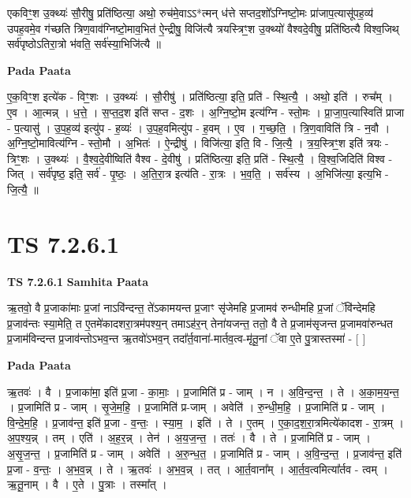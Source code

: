 \documentclass[17pt]{extarticle}
\begin{document}
एकविꣳ॒॒श उ॒क्थ्यः॑ सौ॒रीषु॒ प्रति॑ष्ठित्या॒ अथो॒ रुच॑मे॒वाऽऽ*त्मन् ध॑त्ते सप्तद॒शो᳚ऽग्निष्टो॒मः प्रा॑जाप॒त्यासू॑पह॒व्य॑ उपह॒वमे॒व ग॑च्छति त्रिण॒वाव॑ग्निष्टो॒माव॒भित॑ ऐ॒न्द्रीषु॒ विजि॑त्यै त्रयस्त्रिꣳ॒॒श उ॒क्थ्यो॑ वैश्वदे॒वीषु॒ प्रति॑ष्ठित्यै विश्व॒जिथ् सर्व॑पृष्ठोऽतिरा॒त्रो भ॑वति॒ सर्व॑स्या॒भिजि॑त्यै ॥ \newline

\textbf{Pada Paata} \newline

ए॒क॒विꣳ॒॒श इत्ये॑क - विꣳ॒॒शः । उ॒क्थ्यः॑ । सौ॒रीषु॑ । प्रति॑ष्ठित्या॒ इति॒ प्रति॑ - स्थि॒त्यै॒ । अथो॒ इति॑ । रुच᳚म् । ए॒व । आ॒त्मन्न् । ध॒त्ते॒ । स॒प्त॒द॒श इति॑ सप्त - द॒शः । अ॒ग्नि॒ष्टो॒म इत्य॑ग्नि - स्तो॒मः । प्रा॒जा॒प॒त्यास्विति॑ प्राजा - प॒त्यासु॑ । उ॒प॒ह॒व्य॑ इत्यु॑प - ह॒व्यः॑ । उ॒प॒ह॒वमित्यु॑प - ह॒वम् । ए॒व । ग॒च्छ॒ति॒ । त्रि॒ण॒वाविति॑ त्रि - न॒वौ । अ॒ग्नि॒ष्टो॒मावित्य॑ग्नि - स्तो॒मौ । अ॒भितः॑ । ऐ॒न्द्रीषु॑ । विजि॑त्या॒ इति॒ वि - जि॒त्यै॒ । त्र॒य॒स्त्रिꣳ॒॒श इति॑ त्रयः - त्रिꣳ॒॒शः । उ॒क्थ्यः॑ । वै॒श्व॒दे॒वीष्विति॑ वैश्व - दे॒वीषु॑ । प्रति॑ष्ठित्या॒ इति॒ प्रति॑ - स्थि॒त्यै॒ । वि॒श्व॒जिदिति॑ विश्व - जित् । सर्व॑पृष्ठ॒ इति॒ सर्व॑ - पृ॒ष्ठः॒ । अ॒ति॒रा॒त्र इत्य॑ति - रा॒त्रः । भ॒व॒ति॒ । सर्व॑स्य । अ॒भिजि॑त्या॒ इत्य॒भि - जि॒त्यै॒ ॥  \newline





\section{ TS 7.2.6.1 }

\textbf{TS 7.2.6.1 } \newline
\textbf{Samhita Paata} \newline

ऋ॒तवो॒ वै प्र॒जाका॑माः प्र॒जां नाऽवि॑न्दन्त॒ ते॑ऽकामयन्त प्र॒जाꣳ सृ॑जेमहि प्र॒जामव॑ रुन्धीमहि प्र॒जां ॅवि॑न्देमहि प्र॒जाव॑न्तः स्या॒मेति॒ त ए॒तमे॑कादशरा॒त्रम॑पश्य॒न् तमाऽह॑र॒न् तेना॑यजन्त॒ ततो॒ वै ते प्र॒जाम॑सृजन्त प्र॒जामवा॑रुन्धत प्र॒जाम॑विन्दन्त प्र॒जाव॑न्तोऽभव॒न्त ऋ॒तवो॑ऽभव॒न् तदा᳚र्त॒वाना॑-मार्तव॒त्व-मृ॑तू॒नां ॅवा ए॒ते पु॒त्रास्तस्मा॑ - [  ] \newline

\textbf{Pada Paata} \newline

ऋ॒तवः॑ । वै । प्र॒जाका॑मा॒ इति॑ प्र॒जा - का॒माः॒ । प्र॒जामिति॑ प्र - जाम् । न । अ॒वि॒न्द॒न्त॒ । ते । अ॒का॒म॒य॒न्त॒ । प्र॒जामिति॑ प्र - जाम् । सृ॒जे॒म॒हि॒ । प्र॒जामिति॑ प्र-जाम् । अवेति॑ । रु॒न्धी॒म॒हि॒ । प्र॒जामिति॑ प्र - जाम् । वि॒न्दे॒म॒हि॒ । प्र॒जाव॑न्त॒ इति॑ प्र॒जा - व॒न्तः॒ । स्या॒म॒ । इति॑ । ते । ए॒तम् । ए॒का॒द॒श॒रा॒त्रमित्ये॑कादश - रा॒त्रम् । अ॒प॒श्य॒न्न् । तम् । एति॑ । अ॒ह॒र॒न्न् । तेन॑ । अ॒य॒ज॒न्त॒ । ततः॑ । वै । ते । प्र॒जामिति॑ प्र - जाम् । अ॒सृ॒ज॒न्त॒ । प्र॒जामिति॑ प्र - जाम् । अवेति॑ । अ॒रु॒न्ध॒त॒ । प्र॒जामिति॑ प्र - जाम् । अ॒वि॒न्द॒न्त॒ । प्र॒जाव॑न्त॒ इति॑ प्र॒जा - व॒न्तः॒ । अ॒भ॒व॒न्न् । ते । ऋ॒तवः॑ । अ॒भ॒व॒न्न् । तत् । आ॒र्त॒वाना᳚म् । आ॒र्त॒व॒त्वमित्या᳚र्तव - त्वम् । ऋ॒तू॒नाम् । वै । ए॒ते । पु॒त्राः । तस्मा᳚त् ।  \newline
\end{document}
